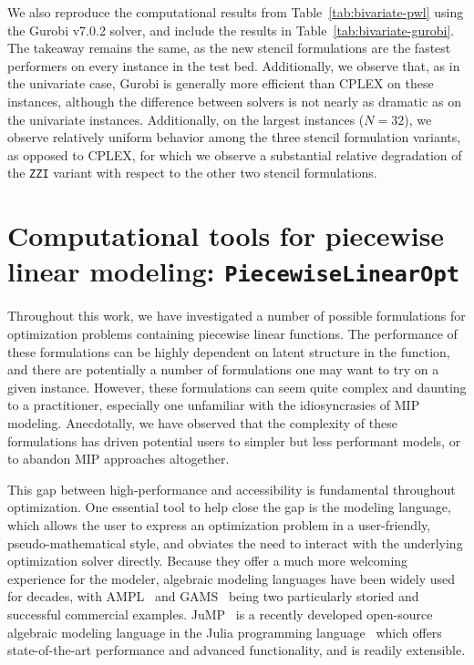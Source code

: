 \documentclass[opre,nonblindrev]{informs3} %
\newcommand{\ZZI}{\texttt{ZZI}}
\begin{document}
{We also reproduce the computational results from Table~\ref{tab:bivariate-pwl} using the Gurobi v7.0.2 solver, and include the results in Table~\ref{tab:bivariate-gurobi}. The takeaway remains the same, as the new stencil formulations are the fastest performers on every instance in the test bed. Additionally, we observe that, as in the univariate case, Gurobi is generally more efficient than CPLEX on these instances, although the difference between solvers is not nearly as dramatic as on the univariate instances. Additionally, on the largest instances ($N=32$), we observe relatively uniform behavior among the three stencil formulation variants, as opposed to CPLEX, for which we observe a substantial relative degradation of the \ZZI{} variant with respect to the other two stencil formulations.
}

\section{Computational tools for piecewise linear modeling: \texttt{PiecewiseLinearOpt}} \label{sec:computational-tools}
Throughout this work, we have investigated a number of possible formulations for optimization problems containing piecewise linear functions. The performance of these formulations can be highly dependent on latent structure in the function, and there are potentially a number of formulations one may want to try on a given instance. However, these formulations can seem quite complex and daunting to a practitioner, especially one unfamiliar with the idiosyncrasies of MIP modeling. Anecdotally, we have observed that the complexity of these formulations has driven potential users to simpler but less performant models, or to abandon MIP approaches altogether.

This gap between high-performance and accessibility is fundamental throughout optimization. One essential tool to help close the gap is the modeling language, which allows the user to express an optimization problem in a user-friendly, pseudo-mathematical style, and obviates the need to interact with the underlying optimization solver directly. Because they offer a much more welcoming experience for the modeler, algebraic modeling languages have been widely used for decades, with AMPL~\citep{Fourer:1989} and GAMS~\citep{Rosenthal:2014} being two particularly storied and successful commercial examples. JuMP~\citep{Dunning:2015a} is a recently developed open-source algebraic modeling language in the Julia programming language~\citep{Bezanson:2017} which offers state-of-the-art performance and advanced functionality, and is readily extensible.
\end{document}
